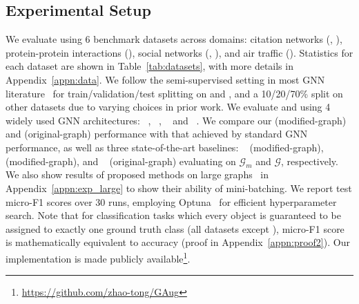 \documentclass[letterpaper]{article} \usepackage{aaai21}  \usepackage{times}  \usepackage{helvet} \usepackage{courier}  \usepackage[hyphens]{url}  \usepackage{graphicx} \urlstyle{rm} \def\UrlFont{\rm}  \usepackage{natbib}  \usepackage{caption} \frenchspacing  \setlength{\pdfpagewidth}{8.5in}  \setlength{\pdfpageheight}{11in}
\begin{document}
\subsection{Experimental Setup}
We evaluate using 6 benchmark datasets across domains: citation networks (\cora, \citeseer \cite{kipf2016semi}), protein-protein interactions (\ppi \cite{hamilton2017inductive}), social networks (\blogc, \flickr \cite{huang2017label}), and air traffic (\airusa \cite{wu2019net}). Statistics for each dataset are shown in Table~\ref{tab:datasets}, with more details in Appendix~\ref{appn:data}.
We follow the semi-supervised setting in most GNN literature~\cite{kipf2016semi, velivckovic2017graph} for train/validation/test splitting on \cora and \citeseer, and a 10/20/70\% split on other datasets due to varying choices in prior work.  We evaluate \methodtwo and \method using 4 widely used GNN architectures:
\gcn~\cite{kipf2016semi}, \gsage~\cite{hamilton2017inductive}, \gat~\cite{velivckovic2017graph} and \jknet~\cite{xu2018representation}. We compare our \methodtwo (modified-graph) and \method (original-graph) performance with that achieved by standard GNN performance, as well as three state-of-the-art baselines: \adaedge~\cite{chen2019measuring} (modified-graph), \bgcn~\cite{zhang2019bayesian} (modified-graph), and \dropedge~\cite{rong2019dropedge} (original-graph) evaluating on $\mathcal{G}_m$ and $\mathcal{G}$, respectively. We also show results of proposed \methodshared methods on large graphs~\cite{hu2020open} in Appendix~\ref{appn:exp_large} to show their ability of mini-batching. We report test micro-F1 scores over 30 runs, employing Optuna~\cite{akiba2019optuna} for efficient hyperparameter search. Note that for classification tasks which every object is guaranteed to be assigned to exactly one ground truth class (all datasets except \ppi), micro-F1 score is mathematically equivalent to accuracy (proof in Appendix~\ref{appn:proof2}).
Our implementation is made publicly available\footnote{\url{https://github.com/zhao-tong/GAug}}.
\end{document}
